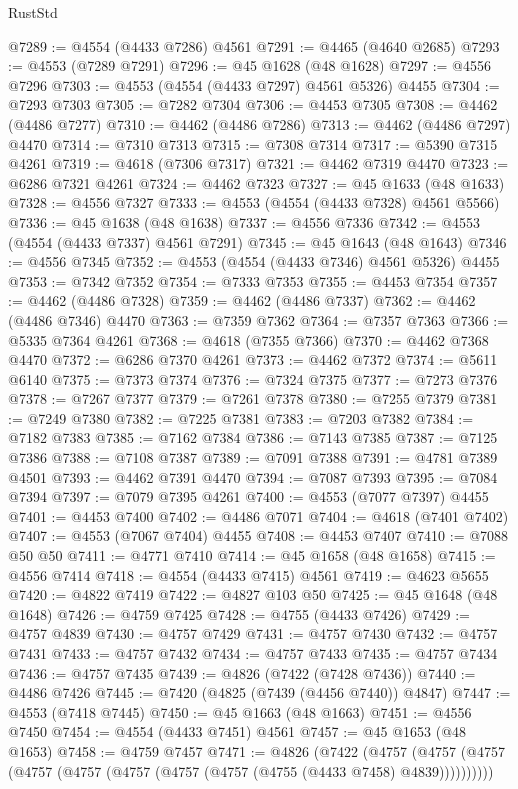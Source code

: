 \begin{lexlean}{RustStd}
\begin{coremodule}
@7289 := @4554 (@4433 @7286) @4561
@7291 := @4465 (@4640 @2685)
@7293 := @4553 (@7289 @7291)
@7296 := @45 @1628 (@48 @1628)
@7297 := @4556 @7296
@7303 := @4553 (@4554 (@4433 @7297) @4561 @5326) @4455
@7304 := @7293 @7303
@7305 := @7282 @7304
@7306 := @4453 @7305
@7308 := @4462 (@4486 @7277)
@7310 := @4462 (@4486 @7286)
@7313 := @4462 (@4486 @7297) @4470
@7314 := @7310 @7313
@7315 := @7308 @7314
@7317 := @5390 @7315 @4261
@7319 := @4618 (@7306 @7317)
@7321 := @4462 @7319 @4470
@7323 := @6286 @7321 @4261
@7324 := @4462 @7323
@7327 := @45 @1633 (@48 @1633)
@7328 := @4556 @7327
@7333 := @4553 (@4554 (@4433 @7328) @4561 @5566)
@7336 := @45 @1638 (@48 @1638)
@7337 := @4556 @7336
@7342 := @4553 (@4554 (@4433 @7337) @4561 @7291)
@7345 := @45 @1643 (@48 @1643)
@7346 := @4556 @7345
@7352 := @4553 (@4554 (@4433 @7346) @4561 @5326) @4455
@7353 := @7342 @7352
@7354 := @7333 @7353
@7355 := @4453 @7354
@7357 := @4462 (@4486 @7328)
@7359 := @4462 (@4486 @7337)
@7362 := @4462 (@4486 @7346) @4470
@7363 := @7359 @7362
@7364 := @7357 @7363
@7366 := @5335 @7364 @4261
@7368 := @4618 (@7355 @7366)
@7370 := @4462 @7368 @4470
@7372 := @6286 @7370 @4261
@7373 := @4462 @7372
@7374 := @5611 @6140
@7375 := @7373 @7374
@7376 := @7324 @7375
@7377 := @7273 @7376
@7378 := @7267 @7377
@7379 := @7261 @7378
@7380 := @7255 @7379
@7381 := @7249 @7380
@7382 := @7225 @7381
@7383 := @7203 @7382
@7384 := @7182 @7383
@7385 := @7162 @7384
@7386 := @7143 @7385
@7387 := @7125 @7386
@7388 := @7108 @7387
@7389 := @7091 @7388
@7391 := @4781 @7389 @4501
@7393 := @4462 @7391 @4470
@7394 := @7087 @7393
@7395 := @7084 @7394
@7397 := @7079 @7395 @4261
@7400 := @4553 (@7077 @7397) @4455
@7401 := @4453 @7400
@7402 := @4486 @7071
@7404 := @4618 (@7401 @7402)
@7407 := @4553 (@7067 @7404) @4455
@7408 := @4453 @7407
@7410 := @7088 @50 @50
@7411 := @4771 @7410
@7414 := @45 @1658 (@48 @1658)
@7415 := @4556 @7414
@7418 := @4554 (@4433 @7415) @4561
@7419 := @4623 @5655
@7420 := @4822 @7419
@7422 := @4827 @103 @50
@7425 := @45 @1648 (@48 @1648)
@7426 := @4759 @7425
@7428 := @4755 (@4433 @7426)
@7429 := @4757 @4839
@7430 := @4757 @7429
@7431 := @4757 @7430
@7432 := @4757 @7431
@7433 := @4757 @7432
@7434 := @4757 @7433
@7435 := @4757 @7434
@7436 := @4757 @7435
@7439 := @4826 (@7422 (@7428 @7436))
@7440 := @4486 @7426
@7445 := @7420 (@4825 (@7439 (@4456 @7440)) @4847)
@7447 := @4553 (@7418 @7445)
@7450 := @45 @1663 (@48 @1663)
@7451 := @4556 @7450
@7454 := @4554 (@4433 @7451) @4561
@7457 := @45 @1653 (@48 @1653)
@7458 := @4759 @7457
@7471 := @4826
    (@7422
      (@4757 (@4757 (@4757 (@4757 (@4757 (@4757 (@4757 (@4757 (@4755 (@4433 @7458) @4839))))))))))

\end{coremodule}
\end{lexlean}
